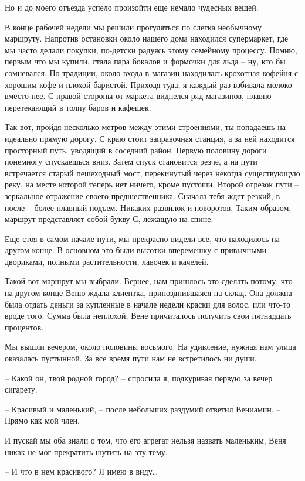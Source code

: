 \documentclass[
]{book}
\begin{document}
Но и до моего отъезда успело произойти еще немало чудесных вещей.

В конце рабочей недели мы решили прогуляться по слегка необычному маршруту. Напротив остановки около нашего дома находился супермаркет, где мы часто делали покупки, по-детски радуясь этому семейному процессу. Помню, первым что мы купили, стала пара бокалов и формочки для льда -- ну, кто бы сомневался. По традиции, около входа в магазин находилась крохотная кофейня с хорошим кофе и плохой баристой. Приходя туда, я каждый раз взбивала молоко вместо нее. С правой стороны от маркета виднелся ряд магазинов, плавно перетекающий в толпу баров и кафешек.

Так вот, пройдя несколько метров между этими строениями, ты попадаешь на идеально прямую дорогу. С краю стоит заправочная станция, а за ней находится просторный путь, уводящий в соседний район. Первую половину дороги понемногу спускаешься вниз. Затем спуск становится резче, а на пути встречается старый пешеходный мост, перекинутый через некогда существующую реку, на месте которой теперь нет ничего, кроме пустоши. Второй отрезок пути -- зеркальное отражение своего предшественника. Сначала тебя ждет резкий, в после -- более плавный подъем. Никаких развилок и поворотов. Таким образом, маршрут представляет собой букву С, лежащую на спине.

Еще стоя в самом начале пути, мы прекрасно видели все, что находилось на другом конце. В основном это были высотки вперемешку с привычными двориками, полными растительности, лавочек и качелей.

Такой вот маршрут мы выбрали. Вернее, нам пришлось это сделать потому, что на другом конце Веню ждала клиентка, припозднившаяся на склад. Она должна была отдать деньги за купленные в начале недели краски для волос, или что-то вроде того. Сумма была неплохой, Вене причиталось получить свои пятнадцать процентов.

Мы вышли вечером, около половины восьмого. На удивление, нужная нам улица оказалась пустынной. За все время пути нам не встретилось ни души.

-- Какой он, твой родной город? -- спросила я, подкуривая первую за вечер сигарету.

-- Красивый и маленький, -- после небольших раздумий ответил Вениамин. -- Прямо как мой член.

И пускай мы оба знали о том, что его агрегат нельзя назвать маленьким, Веня никак не мог прекратить шутить на эту тему.

-- И что в нем красивого? Я имею в виду\ldots{}
\end{document}
